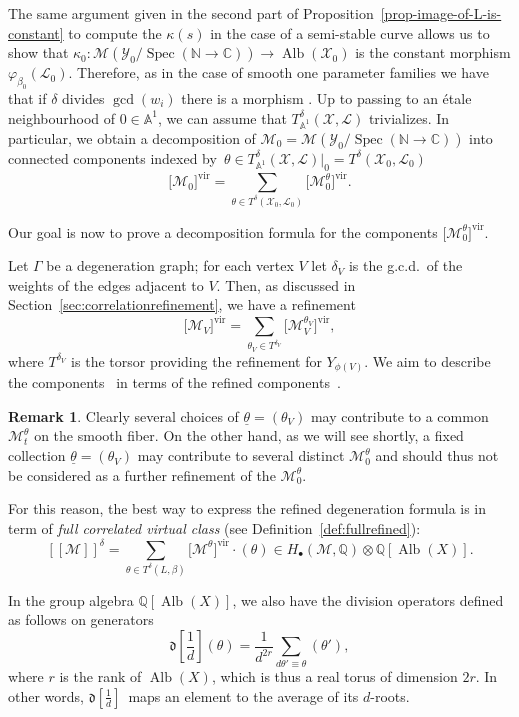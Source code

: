 \documentclass[pdftex]{sigma}
\newcommand{\vir}[1]{\big[#1\big]^\mathrm{vir}}
\newcommand{\fvir}[2]{[\![ #1 ]\!]^{#2}}
\renewcommand{\d}[1]{\dfk\left[ #1 \right]}
\newcommand{\Alb}{\operatorname{Alb}}
\newcommand{\QQ}{\mathbb{Q}}
\renewcommand{\AA}{\mathbb{A}}
\newcommand{\btheta}{ {\underline{\theta}} }
\newcommand{\dfk}{\mathfrak{d}}
\renewcommand{\L}{\mathcal{L}}
\newcommand{\M}{\mathcal{M}}
\newcommand{\X}{\mathcal{X}}
\newcommand{\Y}{\mathcal{Y}}
\numberwithin{equation}{section}
\theoremstyle{definition}
\newtheorem{remarkk}[theo]{Remark}
\begin{document}
The same argument given in the second part of Proposition~\ref{prop-image-of-L-is-constant} to compute the $\kappa(s)$ in the case of a semi-stable curve
allows us to show that
$\kappa_0\colon \M(\Y_0\slash \operatorname{Spec}(\mathbb N\to\mathbb C))\to \operatorname{Alb}(\X_0)$
is the constant morphism $\varphi_{\beta_0}(\L_0)$. Therefore, as in the case of smooth one parameter families we have that if $\delta$ divides $\gcd(w_i)$ there is a morphism
\smash{$
\kappa_{\AA^1}^\delta\colon \M\bigl(\Y_t\slash\mathbb A^1\bigr)\to T^\delta_{\mathbb A^1}(\X,\L)$}.
Up to passing to an \'etale neighbourhood of $0\in\mathbb A^1$, we can assume that $T^\delta_{\mathbb A^1}(\X,\L)$ trivializes.
In particular, we obtain a decomposition of $\M_0=\M(\Y_0\slash \operatorname{Spec}(\mathbb N\to\mathbb C))$ into connected components indexed by~${\theta\in T^\delta_{\mathbb A^1}(\X,\L)\rvert_0=T^\delta(\X_0,\L_0)}$
\[
\vir{\M_0}=\sum_{\theta\in T^\delta(\X_0,\L_0)} \vir{\M_0^{\theta}}.
\]

Our goal is now to prove a decomposition formula for the components $\vir{\M_0^{\theta}}$.

Let $\Gamma$ be a degeneration graph; for each vertex $V$ let $\delta_V$ is the g.c.d.\ of the weights of the edges adjacent to $V$. Then, as discussed in Section~\ref{sec:correlationrefinement}, we have a refinement
\[ \vir{\M_V}=\sum_{\theta_V\in T^{\delta_V}}\vir{\M_V^{\theta_V}},\]
where $T^{\delta_V}$ is the torsor providing the refinement for $Y_{\phi(V)}$. We aim to describe the components~\smash{$\vir{\M_0^{\theta}}$} in terms of the refined components~\smash{$\M_V^{\theta_V}$}.

\begin{remarkk}
Clearly several choices of $\btheta=(\theta_V)$ may contribute to a common $\M_t^{\theta}$ on the smooth fiber. On the other hand, as we will see shortly, a fixed collection $\btheta=(\theta_V)$ may contribute to several distinct $\M_0^\theta$ and should thus not be considered as a further refinement of the $\M_0^\theta$.
\end{remarkk}



For this reason, the best way to express the refined degeneration formula is in term of \textit{full correlated virtual class} (see Definition~\ref{def:fullrefined}):
\[ \fvir{\M}{\delta} = \sum_{\theta\in T^\delta(L,\beta)} \vir{\M^\theta}\cdot (\theta) \in H_\bullet(\M,\QQ)\otimes\QQ[\Alb(X)].\]


In the group algebra $\QQ[\Alb(X)]$, we also have the division operators defined as follows on generators
\[ \d{\frac{1}{d}}(\theta) = \frac{1}{d^{2r}}\sum_{d\theta'\equiv\theta}(\theta'), \]
where $r$ is the rank of $\Alb(X)$, which is thus a real torus of dimension $2r$. In other words, $\d{\frac{1}{d}}$~maps an element to the average of its $d$-roots.
\end{document}
